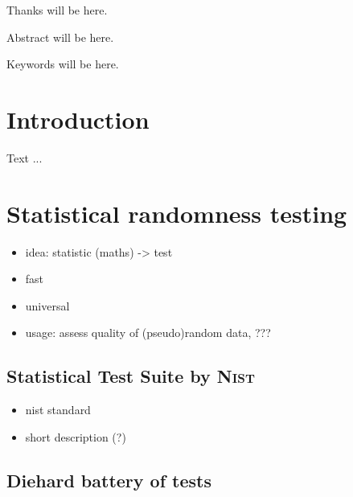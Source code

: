 \documentclass[12pt,oneside]{fithesis2}
\begin{document}
\FrontMatter
\ThesisTitlePage

\begin{ThesisDeclaration}
\DeclarationText
\AdvisorName
\end{ThesisDeclaration}

\begin{ThesisThanks}
Thanks will be here.
\end{ThesisThanks}

\begin{ThesisAbstract}
Abstract will be here.
\end{ThesisAbstract}

\begin{ThesisKeyWords}
Keywords will be here.
\end{ThesisKeyWords}

\MainMatter
\tableofcontents
\chapter{Introduction}
\label{chap:intro}
Text ...

\chapter{Statistical randomness testing}
\label{chap:stat-rand-testing}

\begin{itemize}
\item idea: statistic (maths) -> test
\item fast
\item universal
\item usage: assess quality of (pseudo)random data, ???
\end{itemize}

\section{Statistical Test Suite by \textsc{Nist}}
\label{sec:sts-nist}

\begin{itemize}
\item nist standard
\item short description (?)
\end{itemize}

\section{Diehard battery of tests}
\label{sec:diehard}
\end{document}
